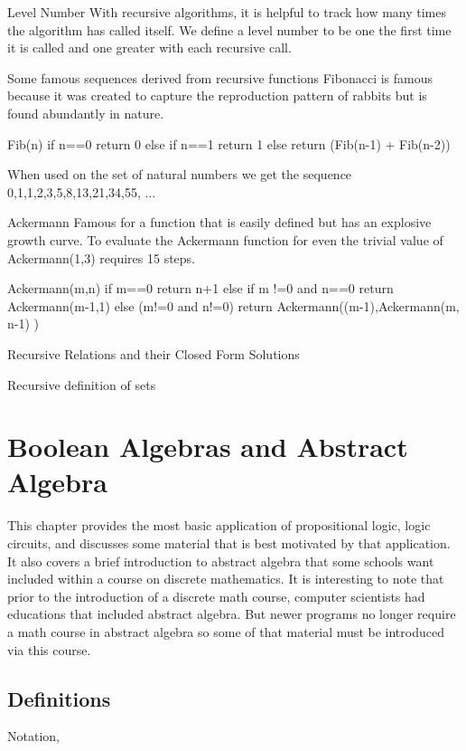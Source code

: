 \documentclass[11pt]{book} %
\theoremstyle {definition}
\theoremstyle {remark}
\begin{document}
Level Number
With recursive algorithms, it is helpful to track how many times the algorithm has called itself. We define a level number to be one the first time it is called and one greater with each recursive call.

Some famous sequences derived from recursive functions
Fibonacci is famous because it was created to capture the reproduction pattern of rabbits but is found abundantly in nature.

Fib(n)
if n==0
    return 0
else if n==1
    return 1
else 
    return (Fib(n-1) + Fib(n-2))

When used on the set of natural numbers we get the sequence
0,1,1,2,3,5,8,13,21,34,55, ...

Ackermann
Famous for a function that is easily defined but has an explosive growth curve. To evaluate the Ackermann function for even the trivial value of Ackermann(1,3) requires 15 steps.

Ackermann(m,n)
if m==0
    return n+1
else if m !=0 and n==0
    return Ackermann(m-1,1)
else (m!=0 and n!=0)
    return Ackermann((m-1),Ackermann(m, n-1) )


Recursive Relations and their Closed Form Solutions

Recursive definition of sets

\newpage




\chapter {Boolean Algebras and Abstract Algebra}
This chapter provides the most basic application of propositional logic, logic circuits, and discusses some material that is best motivated by that application. It also covers a brief introduction to abstract algebra that some schools want included within a course on discrete mathematics. It is interesting to note that prior to the introduction of a discrete math course, computer scientists had educations that included abstract algebra. But newer programs no longer require a math course in abstract algebra so some of that material must be introduced via this course. 

\section {Definitions}
Notation, 
\end{document}
